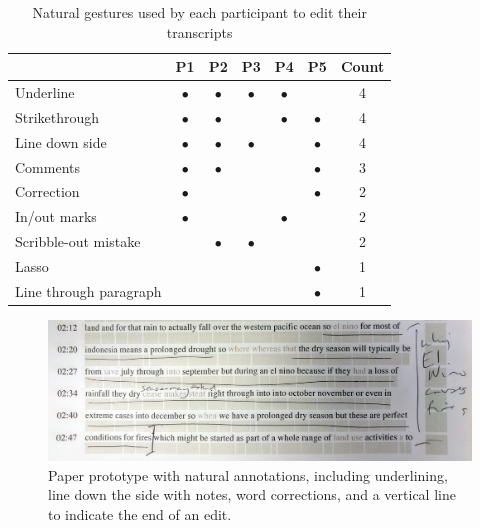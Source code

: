 \begin{table}[ht]
  \centering
  \begin{tabular}{|l|c|c|c|c|c|c|}
    \hline
    & P1        & P2        & P3        & P4        & P5        & Count \\
    \hline
    Underline               & $\bullet$ & $\bullet$ & $\bullet$ & $\bullet$ &           & 4 \\
    \hline
    Strikethrough           & $\bullet$ & $\bullet$ &           & $\bullet$ & $\bullet$ & 4 \\
    \hline
    Line down side          & $\bullet$ & $\bullet$ & $\bullet$ &           & $\bullet$ & 4 \\
    \hline
    Comments                & $\bullet$ & $\bullet$ &           &           & $\bullet$ & 3 \\
    \hline
    Correction              & $\bullet$ &           &           &           & $\bullet$ & 2 \\
    \hline
    In/out marks            & $\bullet$ &           &           & $\bullet$ &           & 2 \\
    \hline
    Scribble-out mistake    &           & $\bullet$ & $\bullet$ &           &           & 2 \\
    \hline
    Lasso                   &           &           &           &           & $\bullet$ & 1 \\
    \hline
    Line through paragraph  &           &           &           &           & $\bullet$ & 1 \\
    \hline
  \end{tabular}
  \caption{Natural gestures used by each participant to edit their transcripts}
  \label{tab:natural-gestures}
\end{table}

\begin{figure}[h]
  \centering
  \includegraphics[width=\columnwidth]{figs/mockup-cropped}
  \caption{Paper prototype with natural annotations, including
    underlining, line down the side with notes, word corrections, and a
  vertical line to indicate the end of an edit.}
  \label{fig:natural}
\end{figure}

